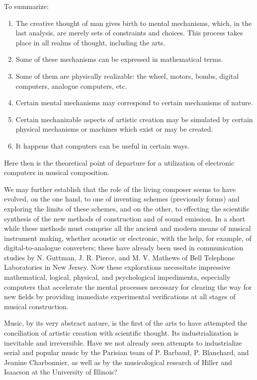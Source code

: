 \documentclass[letterpaper, 11pt]{article}
\begin{document}
To summarize:
\begin{enumerate}
    \item
        The creative thought of man gives birth to mental mechanisms, which, in the last analysis,
        are merely sets of constraints and choices. This process takes place in all realms of
        thought, including the arts.
    \item
        Some of these mechanisms can be expressed in mathematical terms.
    \item
        Some of them are physically realizable: the wheel, motors, bombs, digital computers,
        analogue computers, etc.
    \item
        Certain mental mechanisms may correspond to certain mechanisms of nature.
    \item
        Certain mechanizable aspects of artistic creation may be simulated by certain physical
        mechanisms or machines which exist or may be created.
    \item
        It happens that computers can be useful in certain ways.
\end{enumerate}

Here then is the theoretical point of departure for a utilization of electronic computers in musical
composition.

We may further establish that the role of the living composer seems to have evolved, on the one
hand, to one of inventing schemes (previously forms) and exploring the limits of these schemes, and
on the other, to effecting the scientific synthesis of the new methods of construction and of sound
emission. In a short while these methods must comprise all the ancient and modern means of musical
instrument making, whether acoustic or electronic, with the help, for example, of
digital-to-analogue converters; these have already been used in communication studies by N. Guttman,
J. R. Pierce, and M. V. Mathews of Bell Telephone Laboratories in New Jersey. Now these explorations
necessitate impressive mathematical, logical, physical, and psychological impedimenta, especially
computers that accelerate the mental processes necessary for clearing the way for new fields by
providing immediate experimental verifications at all stages of musical construction.

Music, by its very abstract nature, is the first of the arts to have attempted the conciliation of
artistic creation with scientific thought. Its industrialization is inevitable and irreversible.
Have we not already seen attempts to industrialize serial and popular music by the Parisian team of
P. Barbaud, P. Blanchard, and Jeanine Charbonnier, as well as by the musicological research of
Hiller and Isaacson at the University of Illinois?
\end{document}
